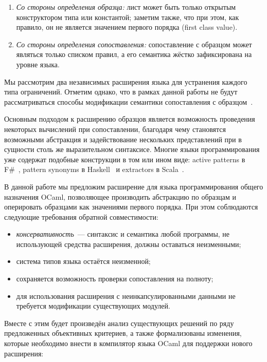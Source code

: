 \begin{enumerate}
	\item \textit{Со стороны определения образца:} лист может быть только открытым конструктором типа или константой; заметим также, что при этом, как правило, он не является значением первого порядка (first class value).
	\item \textit{Со стороны определения сопоставления:} сопоставление с образцом может являться только списком правил, а его семантика жёстко зафиксирована на уровне языка.
\end{enumerate}

Мы рассмотрим два независимых расширения языка для устранения каждого типа ограничений. Отметим однако, что в рамках данной работы не будут рассматриваться способы модификации семантики сопоставления с образцом~\cite{syme2007extensible, tullsen2000firstclass}.

Основным подходом к расширению образцов является возможность проведения некоторых вычислений при сопоставлении, благодаря чему становятся возможными абстракция и задействование нескольких представлений при в сущности столь же выразительном синтаксисе. Многие языки программирования уже содержат подобные конструкции в том или ином виде: active patterns в F\#~\cite{syme2007extensible}, pattern synonyms в Haskell~\cite{pickering2016pattern} и extractors в Scala~\cite{emir2007objects}. 

В данной работе мы предложим расширение для языка программирования общего назначения OCaml, позволяющее производить абстракцию по образцам и оперировать образцами как значениями первого \mbox{порядка}. При этом соблюдаются следующие требования обратной совместимости:

\begin{itemize}
  \item \textit{консервативность}~--- синтаксис и семантика любой программы, не использующей средства расширения, должны оставаться неизменными;
  \item система типов языка остаётся неизменной;
  \item сохраняется возможность проверки сопоставления на полноту;
  \item для использования расширения с неинкапсулированными данными не требуется модификации существующих модулей.
\end{itemize}

Вместе с этим будет произведён анализ существующих решений по ряду предложенных объективных критериев, а также формализованы изменения, которые необходимо внести в компилятор языка OCaml для поддержки нового расширения:
  
